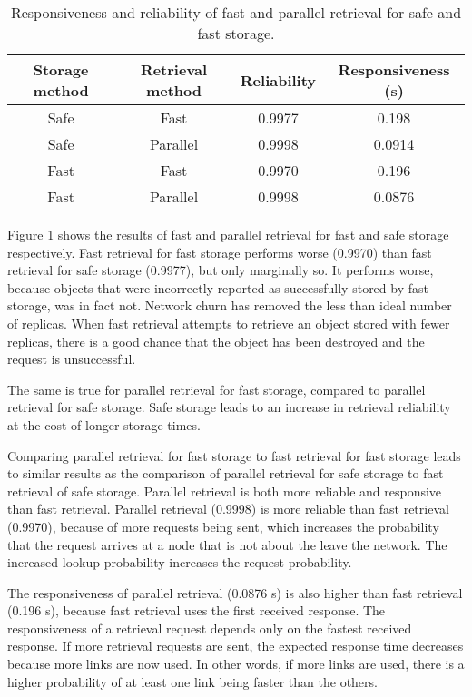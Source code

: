 \begin{table}[htbp]
\centering
\begin{tabular}{|c|c|c|c|}
\hline
Storage method & Retrieval method & Reliability & Responsiveness (s)\\
\hline
Safe    &   Fast        &   0.9977  &   0.198  \\
Safe    &   Parallel    &   0.9998  &   0.0914 \\
Fast    &   Fast        &   0.9970  &   0.196  \\
Fast    &   Parallel    &   0.9998  &   0.0876 \\
\hline
\end{tabular}
\caption{Responsiveness and reliability of fast and parallel retrieval for safe and fast storage.}
\label{tab_pithos_retrieval_results}
\end{table}
%
Figure \ref{tab_pithos_retrieval_results} shows the results of fast and parallel retrieval for fast and safe storage respectively. Fast retrieval for fast storage performs worse (0.9970) than fast retrieval for safe storage (0.9977), but only marginally so. It performs worse, because objects that were incorrectly reported as successfully stored by fast storage, was in fact not. Network churn has removed the less than ideal number of replicas. When fast retrieval attempts to retrieve an object stored with fewer replicas, there is a good chance that the object has been destroyed and the request is unsuccessful.

The same is true for parallel retrieval for fast storage, compared to parallel retrieval for safe storage. Safe storage leads to an increase in retrieval reliability at the cost of longer storage times.

Comparing parallel retrieval for fast storage to fast retrieval for fast storage leads to similar results as the comparison of parallel retrieval for safe storage to fast retrieval of safe storage. Parallel retrieval is both more reliable and responsive than fast retrieval. Parallel retrieval (0.9998) is more reliable than fast retrieval (0.9970), because of more requests being sent, which increases the probability that the request arrives at a node that is not about the leave the network. The increased lookup probability increases the request probability.

The responsiveness of parallel retrieval (0.0876 s) is also higher than fast retrieval (0.196 s), because fast retrieval uses the first received response. The responsiveness of a retrieval request depends only on the fastest received response. If more retrieval requests are sent, the expected response time decreases because more links are now used. In other words, if more links are used, there is a higher probability of at least one link being faster than the others.

